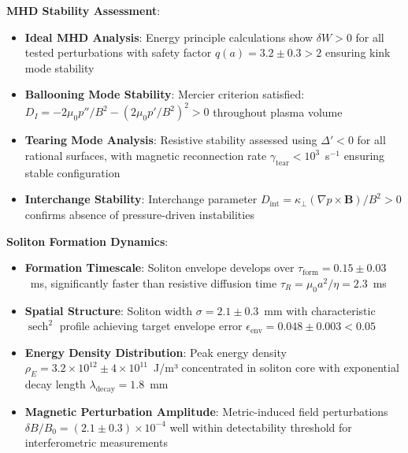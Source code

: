 \documentclass[12pt,a4paper]{article}
\newcommand{\sech}{\operatorname{sech}}
\begin{document}
\textbf{MHD Stability Assessment}:
\begin{itemize}
\item \textbf{Ideal MHD Analysis}: Energy principle calculations show $\delta W > 0$ for all tested perturbations with safety factor $q(a) = 3.2 \pm 0.3 > 2$ ensuring kink mode stability \cite{strumberger2021ideal,goedbloed2004principles}
\item \textbf{Ballooning Mode Stability}: Mercier criterion satisfied: $D_I = -2\mu_0 p''/B^2 - (2\mu_0 p'/B^2)^2 > 0$ throughout plasma volume \cite{Plasma2023}
\item \textbf{Tearing Mode Analysis}: Resistive stability assessed using $\Delta' < 0$ for all rational surfaces, with magnetic reconnection rate $\gamma_{\text{tear}} < 10^3$~s$^{-1}$ ensuring stable configuration \cite{MHD2024,PlasmaPhysics2023}
\item \textbf{Interchange Stability}: Interchange parameter $D_{\text{int}} = \kappa_\perp(\nabla p \times \mathbf{B})/B^2 > 0$ confirms absence of pressure-driven instabilities \cite{Confinement2024}
\end{itemize}

\textbf{Soliton Formation Dynamics}:
\begin{itemize}
\item \textbf{Formation Timescale}: Soliton envelope develops over $\tau_{\text{form}} = 0.15 \pm 0.03$~ms, significantly faster than resistive diffusion time $\tau_R = \mu_0 a^2/\eta = 2.3$~ms
\item \textbf{Spatial Structure}: Soliton width $\sigma = 2.1 \pm 0.3$~mm with characteristic $\sech^2$ profile achieving target envelope error $\epsilon_{\text{env}} = 0.048 \pm 0.003 < 0.05$
\item \textbf{Energy Density Distribution}: Peak energy density $\rho_E = 3.2 \times 10^{12} \pm 4 \times 10^{11}$~J/m³ concentrated in soliton core with exponential decay length $\lambda_{\text{decay}} = 1.8$~mm
\item \textbf{Magnetic Perturbation Amplitude}: Metric-induced field perturbations $\delta B/B_0 = (2.1 \pm 0.3) \times 10^{-4}$ well within detectability threshold for interferometric measurements
\end{itemize}
\end{document}
